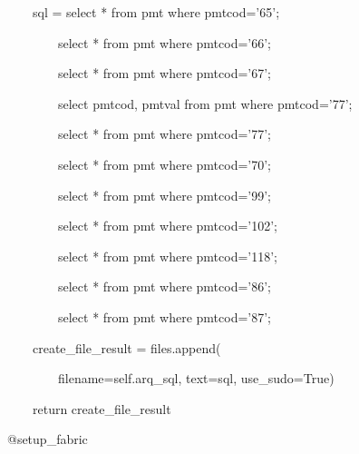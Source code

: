 {\ttfamily\color[rgb]{0.10980392,0.10980392,0.10980392}
    \ \ \ \ \ \ \ \ sql = {\textquotedbl}{\textquotedbl}{\textquotedbl}select * from pmt where pmtcod='65';}

{\ttfamily\color[rgb]{0.10980392,0.10980392,0.10980392}
    \ \ \ \ \ \ \ \ \ \ \ \ select * from pmt where pmtcod='66';}

{\ttfamily\color[rgb]{0.10980392,0.10980392,0.10980392}
    \ \ \ \ \ \ \ \ \ \ \ \ select * from pmt where pmtcod='67';}

{\ttfamily\color[rgb]{0.10980392,0.10980392,0.10980392}
    \ \ \ \ \ \ \ \ \ \ \ \ select pmtcod, pmtval from pmt where pmtcod='77';}

{\ttfamily\color[rgb]{0.10980392,0.10980392,0.10980392}
    \ \ \ \ \ \ \ \ \ \ \ \ select * from pmt where pmtcod='77';}

{\ttfamily\color[rgb]{0.10980392,0.10980392,0.10980392}
    \ \ \ \ \ \ \ \ \ \ \ \ select * from pmt where pmtcod='70';}

{\ttfamily\color[rgb]{0.10980392,0.10980392,0.10980392}
    \ \ \ \ \ \ \ \ \ \ \ \ select * from pmt where pmtcod='99';}

{\ttfamily\color[rgb]{0.10980392,0.10980392,0.10980392}
    \ \ \ \ \ \ \ \ \ \ \ \ select * from pmt where pmtcod='102';}

{\ttfamily\color[rgb]{0.10980392,0.10980392,0.10980392}
    \ \ \ \ \ \ \ \ \ \ \ \ select * from pmt where pmtcod='118';}

{\ttfamily\color[rgb]{0.10980392,0.10980392,0.10980392}
    \ \ \ \ \ \ \ \ \ \ \ \ select * from pmt where pmtcod='86';}

{\ttfamily\color[rgb]{0.10980392,0.10980392,0.10980392}
    \ \ \ \ \ \ \ \ \ \ \ \ select * from pmt where pmtcod='87';{\textquotedbl}{\textquotedbl}{\textquotedbl}}


    \bigskip

{\ttfamily\color[rgb]{0.10980392,0.10980392,0.10980392}
    \ \ \ \ \ \ \ \ create\_file\_result = files.append(}

            {\ttfamily\color[rgb]{0.10980392,0.10980392,0.10980392}
            \ \ \ \ \ \ \ \ \ \ \ \ filename=self.arq\_sql, text=sql, use\_sudo=True)}

{\ttfamily\color[rgb]{0.10980392,0.10980392,0.10980392}
    \ \ \ \ \ \ \ \ return create\_file\_result}


    \bigskip

{\ttfamily\color[rgb]{0.10980392,0.10980392,0.10980392}
    \ \ \ \ @setup\_fabric}

